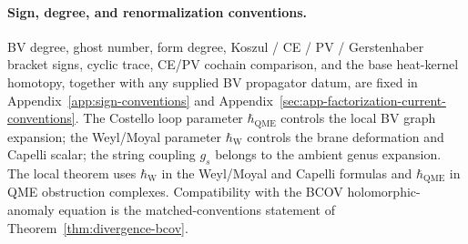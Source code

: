 \documentclass[11pt]{memoir}
\begin{document}
\paragraph{Sign, degree, and renormalization conventions.}
BV degree, ghost number, form degree, Koszul / CE / PV / Gerstenhaber
bracket signs, cyclic trace, CE/PV cochain comparison, and the
base heat-kernel homotopy, together with any supplied BV propagator
datum, are fixed in
Appendix~\ref{app:sign-conventions} and
Appendix~\ref{sec:app-factorization-current-conventions}.  The Costello
loop parameter \(\hbar_{\mathrm{QME}}\) controls the local BV graph
expansion; the Weyl/Moyal parameter \(\hbar_{\mathrm{W}}\) controls the
brane deformation and Capelli scalar; the string coupling \(g_s\)
belongs to the ambient genus expansion.  The local theorem uses
\(\hbar_{\mathrm{W}}\) in the Weyl/Moyal and Capelli formulas and
\(\hbar_{\mathrm{QME}}\) in QME obstruction complexes.  Compatibility
with the BCOV holomorphic-anomaly equation is
the matched-conventions statement of
Theorem~\ref{thm:divergence-bcov}.
\end{document}
